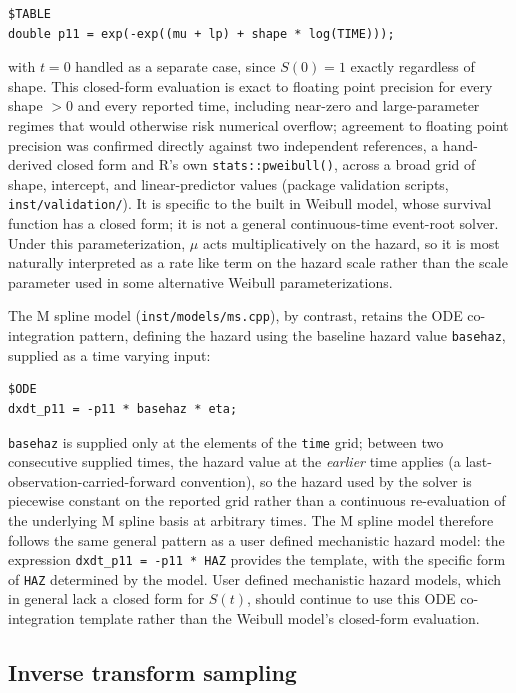 \begin{verbatim}
$TABLE
double p11 = exp(-exp((mu + lp) + shape * log(TIME)));
\end{verbatim}

with \(t = 0\) handled as a separate case, since \(S(0) = 1\) exactly regardless of shape. This closed-form evaluation is exact to floating point precision for every shape \(> 0\) and every reported time, including near-zero and large-parameter regimes that would otherwise risk numerical overflow; agreement to floating point precision was confirmed directly against two independent references, a hand-derived closed form and R's own \texttt{stats::pweibull()}, across a broad grid of shape, intercept, and linear-predictor values (package validation scripts, \texttt{inst/validation/}). It is specific to the built in Weibull model, whose survival function has a closed form; it is not a general continuous-time event-root solver. Under this parameterization, \(\mu\) acts multiplicatively on the hazard, so it is most naturally interpreted as a rate like term on the hazard scale rather than the scale parameter used in some alternative Weibull parameterizations.

The M spline model (\texttt{inst/models/ms.cpp}), by contrast, retains the ODE co-integration pattern, defining the hazard using the baseline hazard value \texttt{basehaz}, supplied as a time varying input:

\begin{verbatim}
$ODE
dxdt_p11 = -p11 * basehaz * eta;
\end{verbatim}

\texttt{basehaz} is supplied only at the elements of the \texttt{time} grid; between two consecutive supplied times, the hazard value at the \emph{earlier} time applies (a last-observation-carried-forward convention), so the hazard used by the solver is piecewise constant on the reported grid rather than a continuous re-evaluation of the underlying M spline basis at arbitrary times. The M spline model therefore follows the same general pattern as a user defined mechanistic hazard model: the expression \texttt{dxdt\_p11\ =\ -p11\ *\ HAZ} provides the template, with the specific form of \texttt{HAZ} determined by the model. User defined mechanistic hazard models, which in general lack a closed form for \(S(t)\), should continue to use this ODE co-integration template rather than the Weibull model's closed-form evaluation.

\subsection{Inverse transform sampling}\label{inverse-transform-sampling}

